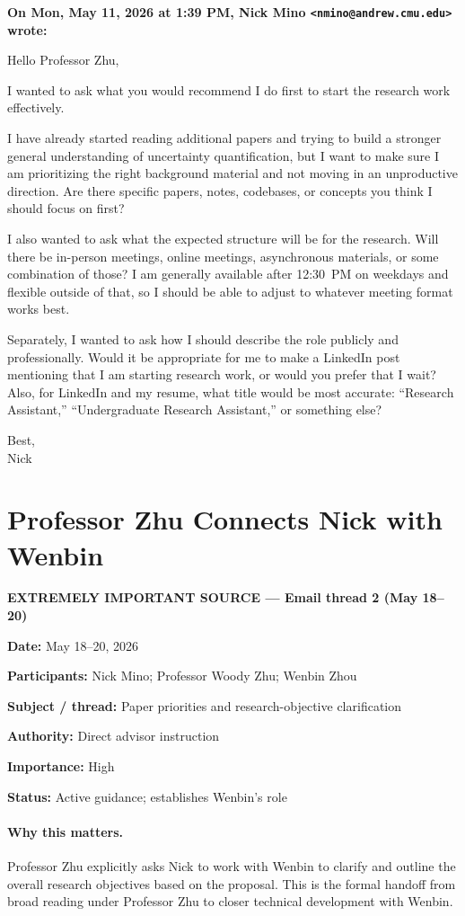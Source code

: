 \documentclass[11pt]{article}
\newcommand{\CriticalSource}[1]{%
  \par\noindent\textcolor{critical}{\textbf{EXTREMELY IMPORTANT SOURCE --- #1}}%
  \par\medskip
}
\newcommand{\Meta}[2]{%
  \par\noindent\textbf{#1:} #2\par\nobreak
}
\newcommand{\Email}[3]{%
  \medskip\noindent\textbf{On #1, #2 wrote:}\par\nobreak
  \begingroup\RaggedRight #3\par\endgroup
}
\begin{document}
\Email{Mon, May 11, 2026 at 1:39 PM}{Nick Mino
\texttt{<nmino@andrew.cmu.edu>}}{%
Hello Professor Zhu,

I wanted to ask what you would recommend I do first to start the research work
effectively.

I have already started reading additional papers and trying to build a
stronger general understanding of uncertainty quantification, but I want to
make sure I am prioritizing the right background material and not moving in an
unproductive direction. Are there specific papers, notes, codebases, or
concepts you think I should focus on first?

I also wanted to ask what the expected structure will be for the research. Will
there be in-person meetings, online meetings, asynchronous materials, or some
combination of those? I am generally available after 12:30~PM on weekdays and
flexible outside of that, so I should be able to adjust to whatever meeting
format works best.

Separately, I wanted to ask how I should describe the role publicly and
professionally. Would it be appropriate for me to make a LinkedIn post
mentioning that I am starting research work, or would you prefer that I wait?
Also, for LinkedIn and my resume, what title would be most accurate:
``Research Assistant,'' ``Undergraduate Research Assistant,'' or something
else?

Best,\\
Nick}

\clearpage
\section{Professor Zhu Connects Nick with Wenbin}
\CriticalSource{Email thread 2 (May 18--20)}

\Meta{Date}{May 18--20, 2026}
\Meta{Participants}{Nick Mino; Professor Woody Zhu; Wenbin Zhou}
\Meta{Subject / thread}{Paper priorities and research-objective clarification}
\Meta{Authority}{Direct advisor instruction}
\Meta{Importance}{High}
\Meta{Status}{Active guidance; establishes Wenbin's role}

\paragraph{Why this matters.}
Professor Zhu explicitly asks Nick to work with Wenbin to clarify and outline
the overall research objectives based on the proposal. This is the formal
handoff from broad reading under Professor Zhu to closer technical development
with Wenbin.
\end{document}
